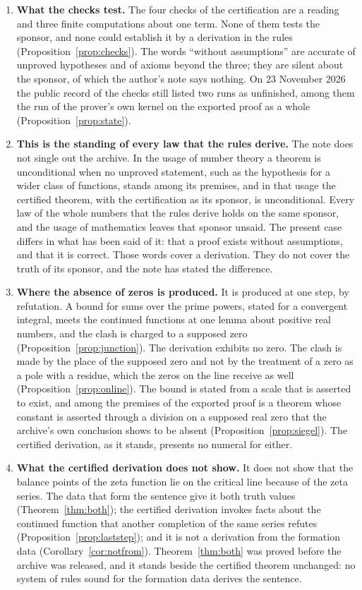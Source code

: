 \documentclass[11pt]{article}
\theoremstyle{definition}
\theoremstyle{remark}
\begin{document}
\begin{enumerate}[leftmargin=2em,itemsep=4pt]
\item \textbf{What the checks test.} The four checks of the certification are a reading and three finite computations about one term. None of them tests the sponsor, and none could establish it by a derivation in the rules (Proposition~\ref{prop:checks}). The words ``without assumptions'' are accurate of unproved hypotheses and of axioms beyond the three; they are silent about the sponsor, of which the author's note says nothing. On 23 November 2026 the public record of the checks still listed two runs as unfinished, among them the run of the prover's own kernel on the exported proof as a whole (Proposition~\ref{prop:state}).

\item \textbf{This is the standing of every law that the rules derive.} The note does not single out the archive. In the usage of number theory a theorem is unconditional when no unproved statement, such as the hypothesis for a wider class of functions, stands among its premises, and in that usage the certified theorem, with the certification as its sponsor, is unconditional. Every law of the whole numbers that the rules derive holds on the same sponsor, and the usage of mathematics leaves that sponsor unsaid. The present case differs in what has been said of it: that a proof exists without assumptions, and that it is correct. Those words cover a derivation. They do not cover the truth of its sponsor, and the note has stated the difference.

\item \textbf{Where the absence of zeros is produced.} It is produced at one step, by refutation. A bound for sums over the prime powers, stated for a convergent integral, meets the continued functions at one lemma about positive real numbers, and the clash is charged to a supposed zero (Proposition~\ref{prop:junction}). The derivation exhibits no zero. The clash is made by the place of the supposed zero and not by the treatment of a zero as a pole with a residue, which the zeros on the line receive as well (Proposition~\ref{prop:online}). The bound is stated from a scale that is asserted to exist, and among the premises of the exported proof is a theorem whose constant is asserted through a division on a supposed real zero that the archive's own conclusion shows to be absent (Proposition~\ref{prop:siegel}). The certified derivation, as it stands, presents no numeral for either.

\item \textbf{What the certified derivation does not show.} It does not show that the balance points of the zeta function lie on the critical line because of the zeta series. The data that form the sentence give it both truth values (Theorem~\ref{thm:both}); the certified derivation invokes facts about the continued function that another completion of the same series refutes (Proposition~\ref{prop:laststep}); and it is not a derivation from the formation data (Corollary~\ref{cor:notfrom}). Theorem~\ref{thm:both} was proved before the archive was released, and it stands beside the certified theorem unchanged: no system of rules sound for the formation data derives the sentence.


\end{enumerate}
\end{document}
